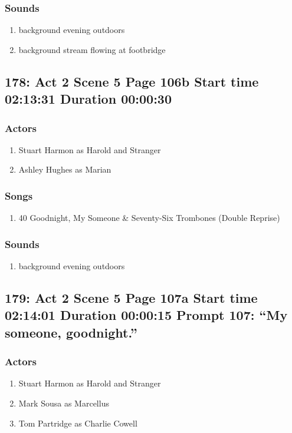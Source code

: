 \subsubsection{Sounds}
\begin{enumerate}
\item background evening outdoors
\item background stream flowing at footbridge
\end{enumerate}
\subsection{178: Act 2 Scene 5 Page 106b Start time 02:13:31 Duration 00:00:30}

\subsubsection{Actors}
\begin{enumerate}
\item Stuart Harmon as Harold and Stranger
\item Ashley Hughes as Marian
\end{enumerate}

\subsubsection{Songs}
\begin{enumerate}
\item 40 Goodnight, My Someone \& Seventy-Six Trombones (Double Reprise)
\end{enumerate}\subsubsection{Sounds}
\begin{enumerate}
\item background evening outdoors
\end{enumerate}
\subsection{179: Act 2 Scene 5 Page 107a Start time 02:14:01 Duration 00:00:15 Prompt 107: ``My someone, goodnight.''}

\subsubsection{Actors}
\begin{enumerate}
\item Stuart Harmon as Harold and Stranger
\item Mark Sousa as Marcellus
\item Tom Partridge as Charlie Cowell
\end{enumerate}


